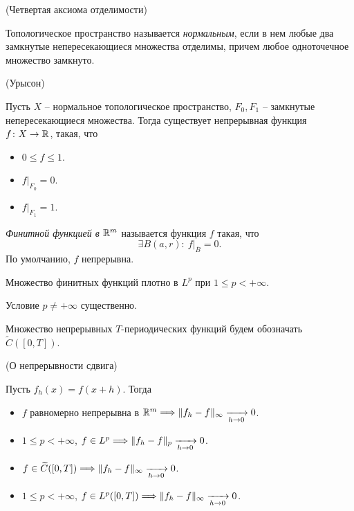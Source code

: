 \begin{definition}(Четвертая аксиома отделимости)
    
    Топологическое пространство называется \textit{нормальным},
    если в нем любые два замкнутые непересекающиеся множества
    отделимы, причем любое одноточечное множество замкнуто.
\end{definition}

\begin{lemma}(Урысон)
    
    Пусть $X$ -- нормальное топологическое пространство, 
    $F_0, F_1$ -- замкнутые непересекающиеся множества. Тогда
    существует непрерывная функция $f \colon X \to \mathbb{R}$, такая, что
    \begin{itemize}
        \item $0 \leqslant f \leqslant 1$.
        \item $f\big|_{F_0} = 0$.
        \item $f\big|_{F_1} = 1$.
    \end{itemize} 
\end{lemma}

\begin{definition}
    \textit{Финитной функцией в $\mathbb{R}^m$} называется функция $f$ такая, что
\[
    \exists B(a, r)\colon~ f\big|_{\overline{B}} = 0
.\] 
    По умолчанию, $f$ непрерывна.
\end{definition}

\begin{theorem}
    Множество финитных функций плотно в $L^p$ при $1 \leqslant p < +\infty$.
\end{theorem}

\begin{remark}
    Условие $p \neq +\infty$ существенно.
\end{remark}

\begin{definition}
    Множество непрерывных $T$-периодических функций будем обозначать $\widetilde{C}([0, T])$.
\end{definition}

\begin{theorem}(О непрерывности сдвига)
    
    Пусть $f_h(x) = f(x + h)$. Тогда
    \begin{itemize}
        \item $f$ равномерно непрерывна в $\mathbb{R}^m \Longrightarrow \lVert f_h - f\rVert_{\infty} \xrightarrow[h \to 0]{} 0$.
        \item $1 \leqslant p < +\infty$, $f \in L^p \Longrightarrow \lVert f_h - f\rVert_p \xrightarrow[h \to 0]{} 0$.
        \item $f \in \widetilde{C}([0, T]) \Longrightarrow \lVert f_h - f\rVert_{\infty} \xrightarrow[h \to 0]{} 0$.
        \item $1 \leqslant p < +\infty$, $f \in L^p([0, T]) \Longrightarrow \lVert f_h - f\rVert_{\infty} \xrightarrow[h \to 0]{} 0$.
    \end{itemize} 
\end{theorem}


